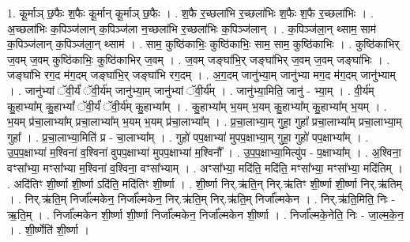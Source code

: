 \documentclass[17pt]{extarticle}
\begin{document}
1. कू॒र्माञ् छ॒फैः श॒फैः कू॒र्मान् कू॒र्माञ् छ॒फैः । . श॒फै र॒च्छला॑भि र॒च्छला॑भिः श॒फैः श॒फै र॒च्छला॑भिः । . अ॒च्छला॑भिः क॒पिञ्ज॑लान् क॒पिञ्ज॑ला न॒च्छला॑भि र॒च्छला॑भिः क॒पिञ्ज॑लान् । . क॒पिञ्ज॑ला॒न् थ्साम॒ साम॑ क॒पिञ्ज॑लान् क॒पिञ्ज॑ला॒न् थ्साम॑ । . साम॒ कुष्ठि॑काभिः॒ कुष्ठि॑काभिः॒ साम॒ साम॒ कुष्ठि॑काभिः । . कुष्ठि॑काभिर् ज॒वम् ज॒वम् कुष्ठि॑काभिः॒ कुष्ठि॑काभिर् ज॒वम् । . ज॒वम् जङ्घा॑भि॒र् जङ्घा॑भिर् ज॒वम् ज॒वम् जङ्घा॑भिः । . जङ्घा॑भि रग॒द म॑ग॒दम् जङ्घा॑भि॒र् जङ्घा॑भि रग॒दम् । . अ॒ग॒दम् जानु॑भ्या॒म् जानु॑भ्या मग॒द म॑ग॒दम् जानु॑भ्याम् । . जानु॑भ्यां ॅवी॒र्यं॑ ॅवी॒र्य॑म् जानु॑भ्या॒म् जानु॑भ्यां ॅवी॒र्य᳚म् । . जानु॑भ्या॒मिति॒ जानु॑ - भ्या॒म् । . वी॒र्य॑म् कु॒हाभ्या᳚म् कु॒हाभ्यां᳚ ॅवी॒र्यं॑ ॅवी॒र्य॑म् कु॒हाभ्या᳚म् । . कु॒हाभ्या᳚म् भ॒यम् भ॒यम् कु॒हाभ्या᳚म् कु॒हाभ्या᳚म् भ॒यम् । . भ॒यम् प्र॑चा॒लाभ्या᳚म् प्रचा॒लाभ्या᳚म् भ॒यम् भ॒यम् प्र॑चा॒लाभ्या᳚म् । . प्र॒चा॒लाभ्या॒म् गुहा॒ गुहा᳚ प्रचा॒लाभ्या᳚म् प्रचा॒लाभ्या॒म् गुहा᳚ । . प्र॒चा॒लाभ्या॒मिति॑ प्र - चा॒लाभ्या᳚म् । . गुहो॑ पप॒क्षाभ्या॑ मुपप॒क्षाभ्या॒म् गुहा॒ गुहो॑ पप॒क्षाभ्या᳚म् । . उ॒प॒प॒क्षाभ्या॑ म॒श्विना॑ व॒श्विना॑ वुपप॒क्षाभ्या॑ मुपप॒क्षाभ्या॑ म॒श्विनौ᳚ । . उ॒प॒प॒क्षाभ्या॒मित्यु॑प - प॒क्षाभ्या᳚म् । . अ॒श्विना॒ वꣳसा᳚भ्या॒ मꣳसा᳚भ्या म॒श्विना॑ व॒श्विना॒ वꣳसा᳚भ्याम् । . अꣳसा᳚भ्या॒ मदि॑ति॒ मदि॑ति॒ मꣳसा᳚भ्या॒ मꣳसा᳚भ्या॒ मदि॑तिम् । . अदि॑तिꣳ शी॒र्ष्णा शी॒र्ष्णा ऽदि॑ति॒ मदि॑तिꣳ शी॒र्ष्णा । . शी॒र्ष्णा निर्.ऋ॑ति॒न् निर्.ऋ॑तिꣳ शी॒र्ष्णा शी॒र्ष्णा निर्.ऋ॑तिम् । . निर्.ऋ॑ति॒म् निर्जा᳚ल्मकेन॒ निर्जा᳚ल्मकेन॒ निर्.ऋ॑ति॒म् निर्.ऋ॑ति॒म् निर्जा᳚ल्मकेन । . निर्.ऋ॑ति॒मिति॒ निः - ऋ॒ति॒म् । . निर्जा᳚ल्मकेन शी॒र्ष्णा शी॒र्ष्णा निर्जा᳚ल्मकेन॒ निर्जा᳚ल्मकेन शी॒र्ष्णा । . निर्जा᳚ल्मके॒नेति॒ निः - जा॒ल्म॒के॒न॒ । . शी॒र्ष्णेति॑ शी॒र्ष्णा । \newline
\end{document}
